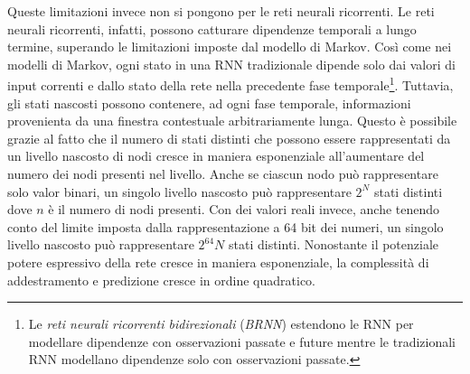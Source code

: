 Queste limitazioni invece non si pongono per le reti neurali ricorrenti.
Le reti neurali ricorrenti, infatti, possono catturare dipendenze temporali a lungo termine, superando le limitazioni imposte dal modello di Markov.
Cos\`i come nei modelli di Markov, ogni stato in una RNN tradizionale dipende solo dai valori di input correnti e dallo stato della rete nella precedente fase temporale\footnote{Le \emph{reti neurali ricorrenti bidirezionali} (\emph{BRNN})\cite{Schuster:1997} estendono le RNN per modellare dipendenze con osservazioni passate e future mentre le tradizionali RNN modellano dipendenze solo con osservazioni passate.}.
Tuttavia, gli stati nascosti possono contenere, ad ogni fase temporale, informazioni provenienta da una finestra contestuale arbitrariamente lunga.
Questo \`e possibile grazie al fatto che il numero di stati distinti che possono essere rappresentati da un livello nascosto di nodi cresce in maniera esponenziale all'aumentare del numero dei nodi presenti nel livello.
Anche se ciascun nodo pu\`o rappresentare solo valor binari, un singolo livello nascosto pu\`o rappresentare $2^N$ stati distinti dove $n$ \`e il numero di nodi presenti.
Con dei valori reali invece, anche tenendo conto del limite imposta dalla rappresentazione a 64 bit dei numeri, un singolo livello nascosto pu\`o rappresentare $2^64N$ stati distinti.
Nonostante il potenziale potere espressivo della rete cresce in maniera esponenziale, la complessit\`a di addestramento e predizione cresce in ordine quadratico.

